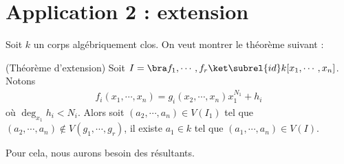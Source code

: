     \section{Application 2 : extension}
        Soit $k$ un corps algébriquement clos. On veut montrer le théorème suivant :
        \begin{theo} (Théorème d'extension)
            Soit $I = \bra f_1, \cdots, f_r \ket \subrel{id} k[x_1, \cdots, x_n]$. Notons
            \begin{align*}
                f_i(x_1, \cdots, x_n) = g_i(x_2, \cdots, x_n)x_1^{N_1} + h_i
            \end{align*}
            où $\deg_{x_1} h_i < N_i$. Alors soit $(a_2, \cdots, a_n) \in V(I_1)$ tel que $(a_2, \cdots, a_n) \notin V(g_1, \cdots, g_r)$, il existe $a_1 \in k$ tel que $(a_1, \cdots, a_n) \in V(I)$.
        \end{theo}
        Pour cela, nous aurons besoin des résultants.

